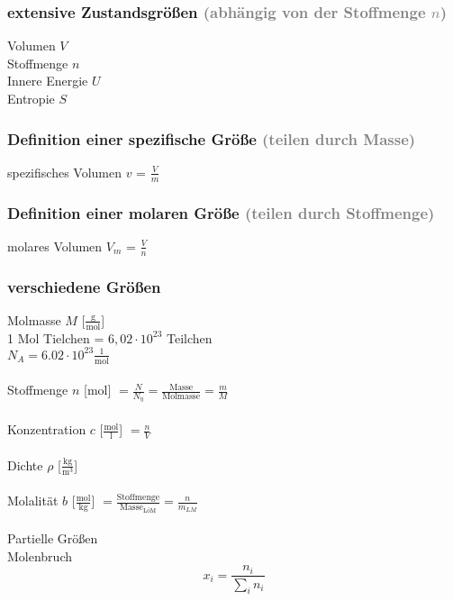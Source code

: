 \documentclass[a4paper]{article}
\begin{document}
\subsubsection{extensive Zustandsgrößen \textcolor{gray}{(abhängig von der Stoffmenge $n$)}}
Volumen $V$\\
Stoffmenge $n$\\
Innere Energie $U$\\
Entropie $S$\\
\subsubsection{Definition einer spezifische Größe \textcolor{gray}{(teilen durch Masse)}}
spezifisches Volumen $v$ = $\frac{V}{m}$
\subsubsection{Definition einer molaren Größe \textcolor{gray}{(teilen durch Stoffmenge)}}
molares Volumen $V_m$ = $\frac{V}{n}$
\subsubsection{verschiedene Größen}
Molmasse $M$ [$\frac{\mathrm{g}}{\mathrm{mol}}$]\\
1 Mol Tielchen = $6, 02 \cdot 10^{23}$ Teilchen\\
$N_A = 6.02 \cdot 10^{23} \frac{1}{\mathrm{mol}}$\\\\
Stoffmenge $n$ [mol] $=\frac{N}{N_\eta}=\frac{\mathrm{Masse}}{\mathrm{Molmasse}}=\frac{m}{M}$\\\\
Konzentration $c$ [$\frac{\mathrm{mol}}{\mathrm{l}}$] $= \frac{n}{V}$\\\\
Dichte $\rho$ [$\frac{\mathrm{kg}}{\mathrm{m}^3}$]\\\\
Molalität $b$ [$\frac{\mathrm{mol}}{\mathrm{kg}}$] $=\frac{\mathrm{Stoffmenge}}{\mathrm{Masse_{L\text{ö}M}}}=\frac{n}{m_{LM}}$\\\\
Partielle Größen\\
Molenbruch\\
\begin{equation*}
    x_i=\frac{n_i}{\sum_i n_i}
\end{equation*}
\end{document}
